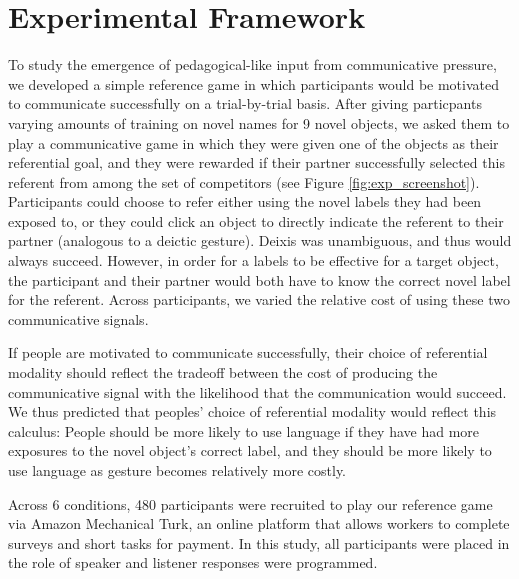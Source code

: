 \documentclass[10pt, letterpaper]{article}
\begin{document}
\hypertarget{experimental-framework}{%
\section{Experimental Framework}\label{experimental-framework}}

To study the emergence of pedagogical-like input from communicative
pressure, we developed a simple reference game in which participants
would be motivated to communicate successfully on a trial-by-trial
basis. After giving particpants varying amounts of training on novel
names for 9 novel objects, we asked them to play a communicative game in
which they were given one of the objects as their referential goal, and
they were rewarded if their partner successfully selected this referent
from among the set of competitors (see Figure \ref{fig:exp_screenshot}).
Participants could choose to refer either using the novel labels they
had been exposed to, or they could click an object to directly indicate
the referent to their partner (analogous to a deictic gesture). Deixis
was unambiguous, and thus would always succeed. However, in order for a
labels to be effective for a target object, the participant and their
partner would both have to know the correct novel label for the
referent. Across participants, we varied the relative cost of using
these two communicative signals.

If people are motivated to communicate successfully, their choice of
referential modality should reflect the tradeoff between the cost of
producing the communicative signal with the likelihood that the
communication would succeed. We thus predicted that peoples' choice of
referential modality would reflect this calculus: People should be more
likely to use language if they have had more exposures to the novel
object's correct label, and they should be more likely to use language
as gesture becomes relatively more costly.

Across 6 conditions, 480 participants were recruited to play our
reference game via Amazon Mechanical Turk, an online platform that
allows workers to complete surveys and short tasks for payment. In this
study, all participants were placed in the role of speaker and listener
responses were programmed.
\end{document}
